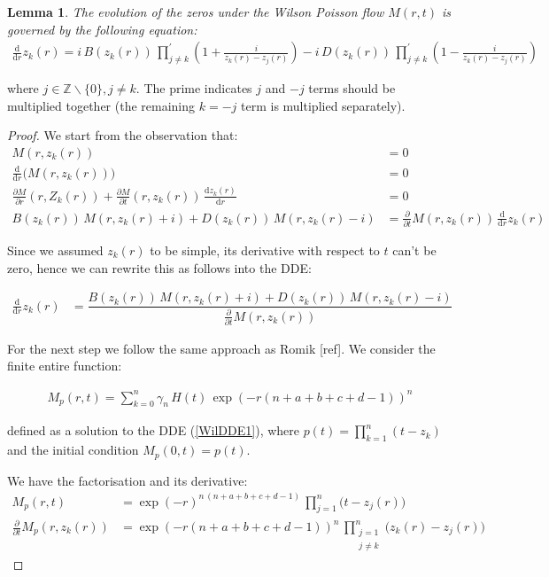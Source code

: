 \documentclass[a4paper,11pt,twoside]{amsart}
\newtheorem{lemma}[theorem]{Lemma}
\newcommand{\verifiedeq}{=}
\newcommand{\defeq}{=}
\newcommand{\verifiedeq}{\stackrel{\checkmark}{=}}
\newcommand{\defeq}{\stackrel{\scriptscriptstyle \textnormal{def}}{=}}
\begin{document}
\begin{lemma}\label{proofWil2} The evolution of the zeros under the Wilson Poisson flow $M(r,t)$ is governed by the following equation:
\begin{align}
 \frac{\mathrm{d}}{\mathrm{d} r}z_k(r) \verifiedeq i\,B(z_k(r))\, \prod^{'}_{j \ne k}\left(1+ \frac{i}{z_k(r)-z_j(r)}\right) -i\,D(z_k(r))\,\prod^{'}_{j \ne k} \left(1-\frac{i}{z_k(r)-z_j(r)}\right)
\end{align}
\end{lemma}
where $j \in \mathbb{Z}\backslash\{0\}, j \ne k$. The prime indicates $j$ and $-j$ terms should be multiplied together (the remaining $k=-j$ term is multiplied separately).
\begin{proof}
We start from the observation that:
\begin{align}
M(r,z_k(r)) &\verifiedeq 0 \\
\frac{\mathrm{d}}{\mathrm{d} r} \big(M(r,z_k(r))\big) &\verifiedeq 0 \\
\frac{\partial M}{\partial r}(r,Z_k(r))+ \frac{\partial M}{\partial t}(r,z_k(r))\,\frac{\mathrm{d} z_k(r)}{\mathrm{d} r} &\verifiedeq 0 \\
B(z_k(r))\,M(r,z_k(r)+i) + D(z_k(r))\,M(r,z_k(r)-i)  &\verifiedeq \frac{\partial}{\partial t}M(r,z_k(r))\,\frac{\mathrm{d}}{\mathrm{d} r}z_k(r)
\end{align}

Since we assumed $z_k(r)$ to be simple, its derivative with respect to $t$ can't be zero, hence we can rewrite this as follows into the DDE:

\begin{align} \label{WilDDE1}
\frac{\mathrm{d} }{\mathrm{d} r}z_k(r) &\verifiedeq \dfrac{B(z_k(r))\,M(r,z_k(r)+i) + D(z_k(r))\,M(r,z_k(r)-i)}{ \frac{\partial}{\partial t}M(r,z_k(r))}
\end{align}

For the next step we follow the same approach as Romik [ref]. We consider the finite entire function:

\begin{align}
M_p(r,t) \verifiedeq \sum_{k=0}^n \gamma_n \, H(t)\,\exp(-r(n+a+b+c+d-1))^{n} 
\end{align}

defined as a solution to the DDE (\ref{WilDDE1}), where $p(t) \defeq \prod_{k=1}^n(t-z_k)$ and the initial condition $M_p(0,t) \defeq p(t)$. 

We have the factorisation and its derivative: 
\begin{align}
M_p(r,t) &\verifiedeq \exp(-r)^{n\,(n+a+b+c+d-1)}\,\prod_{j=1}^n\bigg(t-z_j(r)\bigg)\\
\frac{\partial}{\partial t} M_p(r,z_k(r)) &\verifiedeq \exp\left(-r(n+a+b+c+d-1)\right)^{n}\,\prod^n_{\substack{j=1\\j\ne k}}\bigg(z_k(r)-z_j(r)\bigg)
\end{align}


\end{proof}
\end{document}
